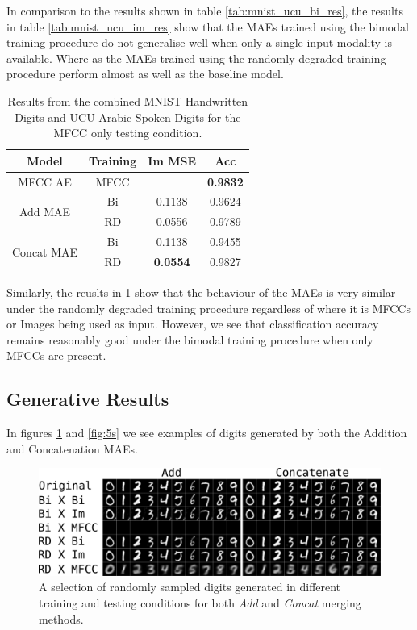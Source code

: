 In comparison to the results shown in table \ref{tab:mnist_ucu_bi_res}, the results in table \ref{tab:mnist_ucu_im_res} show that the MAEs trained using the bimodal training procedure do not generalise well when only a single input modality is available. Where as the MAEs trained using the randomly degraded training procedure perform almost as well as the baseline model. 
\begin{table}
	\centering
		\begin{tabular}{|c|c|c|c|}
		\hline
		Model & Training & Im MSE &  Acc \\ \hline
				
				MFCC AE & MFCC & 					& 	\textbf{0.9832}	\\ \hline		
\multirow{2}{*}{Add MAE} & Bi & 	0.1138			& 	0.9624 			\\ \cline{2-4}
						  & RD &	0.0556			&	0.9789			\\ \hline	
		
\multirow{2}{*}{Concat MAE} & Bi &	0.1138			&	0.9455			\\ \cline{2-4}		
							 & RD & \textbf{0.0554}	& 	0.9827 			\\ \hline
		\end{tabular}
		\caption{Results from the combined MNIST Handwritten Digits and UCU Arabic Spoken Digits for the MFCC only testing condition.}
		\label{tab:mnist_ucu_mfcc_res}

\end{table}

Similarly, the reuslts in \ref{tab:mnist_ucu_mfcc_res} show that the behaviour of the MAEs is very similar under the randomly degraded training procedure regardless of where it is MFCCs or Images being used as input. However, we see that classification accuracy remains reasonably good under the bimodal training procedure when only MFCCs are present. 

\subsection{Generative Results}

In figures \ref{fig:mnistDigits} and \ref{fig:5s} we see examples of digits generated by both the Addition and Concatenation MAEs.
\begin{figure}[h]
\begin{center}
	\includegraphics[width=\textwidth]{Figs/mnistSpoken/lbAll.png}
	\caption{A selection of randomly sampled digits generated in different training and testing conditions for both \textit{Add} and \textit{Concat} merging methods.}
	\label{fig:mnistDigits}
\end{center}
\end{figure}

